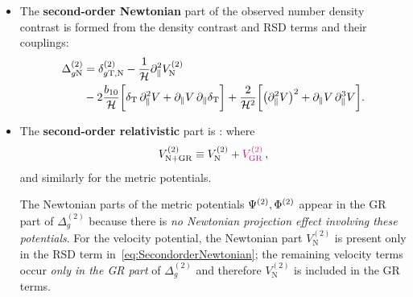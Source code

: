 {{{{\begin{itemize}
\item
The {\bfseries second-order Newtonian} part of the observed number density contrast is formed from the density contrast and RSD terms and their couplings:
\begin{align} 
\Delta^{{{({2})}}}_{g{\mathrm{N}}}
  &= \delta_{g\mathrm{T,N}}^{{{({2})}}} - \frac{1}{\mathcal{H}}\partial_{\parallel}^{2}V^{{{({2})}}}_{\mathrm{N}}
  \notag\\
& - 2\frac{b_{10}}{\mathcal{H}} \bigg[\delta_{\mathrm{T}}\,\partial_{\parallel}^{2}V + \partial_{\parallel}V\,\partial_{\parallel}\delta_{\mathrm{T}}\bigg]
  + \frac{2}{\mathcal{H}^{2}}\bigg[\big(\partial_{\parallel}^{2}V\big)^{2} + \partial_{\parallel}V\,\partial_{\parallel}^{3}V\bigg]. \label{eq:SecondorderNewtonian}
 \end{align}
 
\item
  The {\bfseries second-order relativistic} part is  \cite{Jolicoeur:2017nyt,Jolicoeur:2017eyi}:
where 
\begin{equation}
V_{\mathrm{N+GR}}^{(2)}\equiv V_{\mathrm{N}}^{(2)}+{\color{magenta}{V_{\mathrm{GR}}^{(2)}}}\,, 
\end{equation}
and similarly for the metric potentials.

The Newtonian parts of the metric potentials $\Psi^{{(2)}}, \Phi^{{(2)}}$ appear in the GR part of $\Delta_{g}^{(2)}$ because there is {\em no Newtonian projection effect involving these potentials}. For the velocity potential, the Newtonian part $V^{(2)}_{\mathrm{N}}$ is present only in the RSD term in~\eqref{eq:SecondorderNewtonian}; the remaining velocity terms occur {\em only in the GR part} of $\Delta_{g}^{(2)}$ and therefore   $V^{(2)}_{\mathrm{N}}$ is included in the GR terms.


\end{itemize}}}}}
